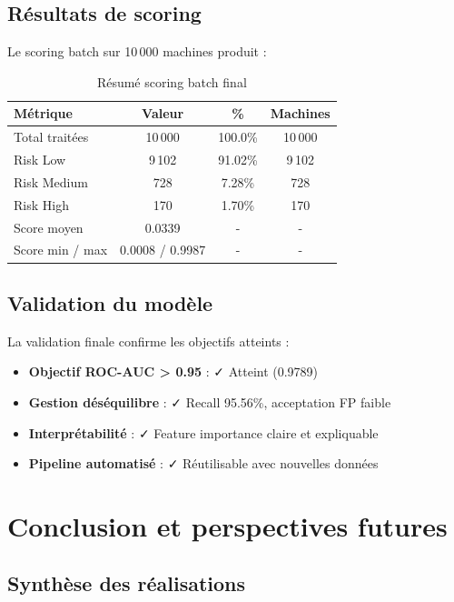 \documentclass[a4paper,12pt,twoside]{report}
\begin{document}
\section{Résultats de scoring}

Le scoring batch sur 10\,000 machines produit :

\begin{table}[H]
\centering
\small
\caption{Résumé scoring batch final}
\begin{tabular}{|l|c|c|c|}
\hline
\textbf{Métrique} & \textbf{Valeur} & \textbf{\%} & \textbf{Machines} \\
\hline\hline
Total traitées & 10\,000 & 100.0\% & 10\,000 \\
\hline
Risk Low & 9\,102 & 91.02\% & 9\,102 \\
\hline
Risk Medium & 728 & 7.28\% & 728 \\
\hline
Risk High & 170 & 1.70\% & 170 \\
\hline
Score moyen & 0.0339 & - & - \\
\hline
Score min / max & 0.0008 / 0.9987 & - & - \\
\hline
\end{tabular}
\end{table}

\section{Validation du modèle}

La validation finale confirme les objectifs atteints :

\begin{itemize}
    \item \textbf{Objectif ROC-AUC > 0.95} : ✓ Atteint (0.9789)
    \item \textbf{Gestion déséquilibre} : ✓ Recall 95.56\%, acceptation FP faible
    \item \textbf{Interprétabilité} : ✓ Feature importance claire et expliquable
    \item \textbf{Pipeline automatisé} : ✓ Réutilisable avec nouvelles données
\end{itemize}

\chapter{Conclusion et perspectives futures}

\section{Synthèse des réalisations}
\end{document}
